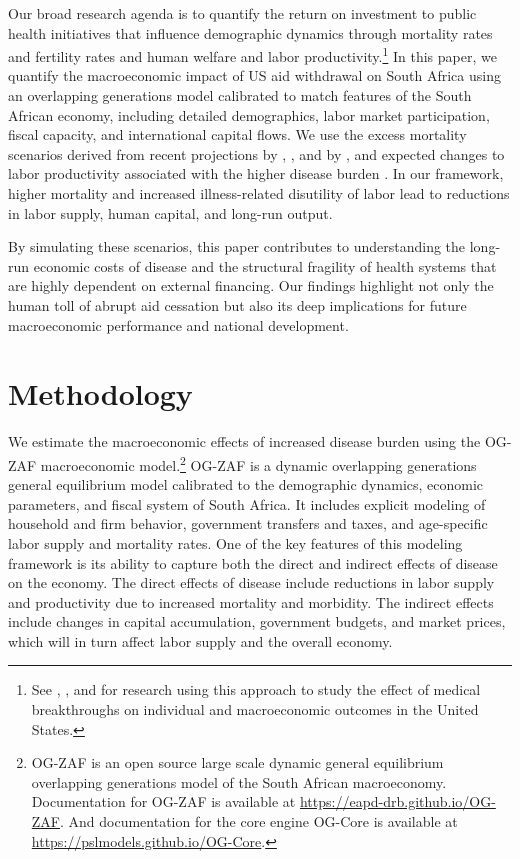 \documentclass[letterpaper,12pt]{article}
\theoremstyle{definition}
\begin{document}
\begin{spacing}{1.5}
Our broad research agenda is to quantify the return on investment to public health initiatives that influence demographic dynamics through mortality rates and fertility rates and human welfare and labor productivity.\footnote{See \citet{DeBackerEtAl:2025}, \citet{RomanniEtAl:2025}, and \citet{RomanniEtAl:forthcoming} for research using this approach to study the effect of medical breakthroughs on individual and macroeconomic outcomes in the United States.} In this paper, we quantify the macroeconomic impact of US aid withdrawal on South Africa using an overlapping generations model calibrated to match features of the South African economy, including detailed demographics, labor market participation, fiscal capacity, and international capital flows. We use the excess mortality scenarios derived from recent projections by \citet{Brink2025}, \citet{Gandhi2025}, and by \citet{KS2025}, and expected changes to labor productivity associated with the higher disease burden \citep{Keogh2024,Panda2024}. In our framework, higher mortality and increased illness-related disutility of labor lead to reductions in labor supply, human capital, and long-run output.

By simulating these scenarios, this paper contributes to understanding the long-run economic costs of disease and the structural fragility of health systems that are highly dependent on external financing. Our findings highlight not only the human toll of abrupt aid cessation but also its deep implications for future macroeconomic performance and national development.


\section{Methodology}\label{SecMethod}

We estimate the macroeconomic effects of increased disease burden using the OG-ZAF macroeconomic model.\footnote{OG-ZAF is an open source large scale dynamic general equilibrium overlapping generations model of the South African macroeconomy. Documentation for OG-ZAF is available at \href{https://eapd-drb.github.io/OG-ZAF}{https://eapd-drb.github.io/OG-ZAF}. And documentation for the core engine OG-Core is available at \href{https://pslmodels.github.io/OG-Core}{https://pslmodels.github.io/OG-Core}.} OG-ZAF is a dynamic overlapping generations general equilibrium model calibrated to the demographic dynamics, economic parameters, and fiscal system of South Africa. It includes explicit modeling of household and firm behavior, government transfers and taxes, and age-specific labor supply and mortality rates. One of the key features of this modeling framework is its ability to capture both the direct and indirect effects of disease on the economy. The direct effects of disease include reductions in labor supply and productivity due to increased mortality and morbidity. The indirect effects include changes in capital accumulation, government budgets, and market prices, which will in turn affect labor supply and the overall economy.


\end{spacing}
\end{document}

